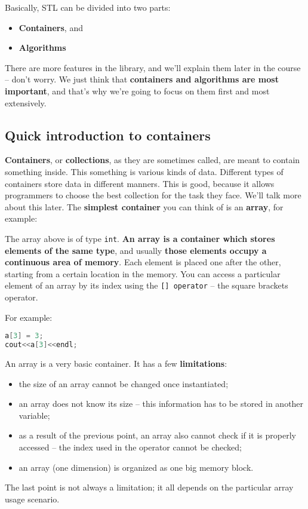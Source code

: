 Basically, STL can be divided into two parts:
\begin{itemize}
    \item \textbf{Containers}, and 
    \item \textbf{Algorithms}
\end{itemize}

There are more features in the library, and we’ll explain them later in the course – 
don’t worry. We just think that \textbf{containers and algorithms are most important}, 
and that’s why we’re going to focus on them first and most extensively.

\subsection{Quick introduction to containers} %

\textbf{Containers}, or \textbf{collections}, as they are sometimes called, are meant 
to contain something inside. This something is various kinds of data. Different types 
of containers store data in different manners.
This is good, because it allows programmers to choose the best collection for the task 
they face. We’ll talk more about this later. The \textbf{simplest container} you can 
think of is an \textbf{array}, for example:


The array above is of type \texttt{int}. \textbf{An array is a container which stores 
elements of the same type}, and usually \textbf{those elements occupy a continuous area of memory}.
Each element is placed one after the other, starting from a certain location in the memory. 
You can access a particular element of an array by its index using the \texttt{[] operator} – 
the square brackets operator.

For example:
\begin{lstlisting}[language=C++]
a[3] = 3;
cout<<a[3]<<endl;
\end{lstlisting}

An array is a very basic container. It has a few \textbf{limitations}:
\begin{itemize}
    \item the size of an array cannot be changed once instantiated;
    \item an array does not know its size – this information has to be stored in another variable;
    \item as a result of the previous point, an array also cannot check if it is properly accessed 
      – the index used in the operator cannot be checked;
    \item an array (one dimension) is organized as one big memory block.
\end{itemize}
The last point is not always a limitation; it all depends on the particular array usage scenario.

